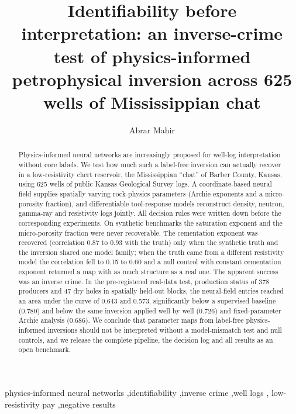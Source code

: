 \documentclass[preprint,12pt]{elsarticle}
\begin{document}
\begin{frontmatter}

\title{Identifiability before interpretation: an inverse-crime test of physics-informed
petrophysical inversion across 625 wells of Mississippian chat}

\author[a]{Abrar Mahir}
\address[a]{Department of Petroleum and Mining Engineering, Shahjalal University of Science and Technology, Kumargaon, Sylhet 3114, Bangladesh}

\begin{abstract}
Physics-informed neural networks are increasingly proposed for well-log interpretation without
core labels. We test how much such a label-free inversion can actually recover in a
low-resistivity chert reservoir, the Mississippian ``chat'' of Barber County, Kansas, using 625
wells of public Kansas Geological Survey logs. A coordinate-based neural field supplies spatially
varying rock-physics parameters (Archie exponents and a micro-porosity fraction), and
differentiable tool-response models reconstruct density, neutron, gamma-ray and resistivity logs
jointly. All decision rules were written down before the corresponding experiments. On synthetic
benchmarks the saturation exponent and the micro-porosity fraction were never recoverable. The
cementation exponent was recovered (correlation 0.87 to 0.93 with the truth) only when the
synthetic truth and the inversion shared one model family; when the truth came from a different
resistivity model the correlation fell to 0.15 to 0.60 and a null control with constant
cementation exponent returned a map with as much structure as a real one. The apparent success
was an inverse crime. In the pre-registered real-data test, production status of 378 producers
and 47 dry holes in spatially held-out blocks, the neural-field entries reached an area under the
curve of 0.643 and 0.573, significantly below a supervised baseline (0.780) and below the same
inversion applied well by well (0.726) and fixed-parameter Archie analysis (0.686). We conclude
that parameter maps from label-free physics-informed inversions should not be interpreted without
a model-mismatch test and null controls, and we release the complete pipeline, the decision log
and all results as an open benchmark.
\end{abstract}

\begin{keyword}
physics-informed neural networks \sep identifiability \sep inverse crime \sep well logs \sep
low-resistivity pay \sep negative results
\end{keyword}
\end{frontmatter}
\end{document}
